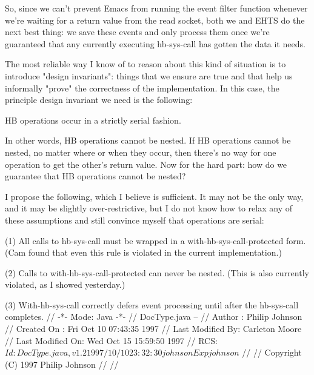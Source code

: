 So, since we can't prevent Emacs from running the event filter function whenever 
we're waiting for a return value from the read socket, both we and EHTS do the next
best thing: we save these events and only process them once we're guaranteed that any
currently executing hb-sys-call has gotten the data it needs. 

The most reliable way I know of to reason about this kind of situation is to introduce 
"design invariants": things that we ensure are true and that help us informally "prove" the 
correctness of the implementation.  In this case, the principle design invariant we need 
is the following:

  HB operations occur in a strictly serial fashion.

In other words, HB operations cannot be nested.  If HB operations cannot be nested, no matter
where or when they occur, then there's no way for one operation to get the other's return value.
Now for the hard part: how do we guarantee that HB operations cannot be nested?

I propose the following, which I believe is sufficient.  It may not be the only way, and it may 
be slightly over-restrictive, but I do not know how to relax any of these assumptions and still
convince myself that operations are serial:

  (1) All calls to hb-sys-call must be wrapped in a with-hb-sys-call-protected form.  (Cam found that
        even this rule is violated in the current implementation.)

  (2) Calls to with-hb-sys-call-protected can never be nested. (This is also currently violated,
        as I showed yesterday.)

  (3) With-hb-sys-call correctly defers event processing until after the hb-sys-call completes.
                                                                                                                                                                                                                                                                                                                                                                                                                                                                                                                                                                                                                                                                                                                                                                                                                                                                                                                                                                                                                                                          //                              -*- Mode: Java -*- 
// DocType.java -- 
// Author          : Philip Johnson
// Created On      : Fri Oct 10 07:43:35 1997
// Last Modified By: Carleton Moore
// Last Modified On: Wed Oct 15 15:59:50 1997
// RCS: $Id: DocType.java,v 1.2 1997/10/10 23:32:30 johnson Exp johnson $
// 
//   Copyright (C) 1997 Philip Johnson
// 
// 


